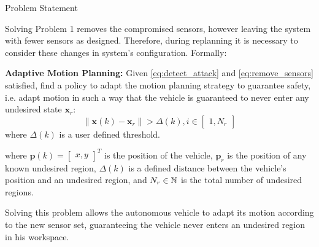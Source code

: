 \begin{section}{Problem Statement}
\begin{problem}
\end{problem}
Solving Problem 1 removes the compromised sensors, however leaving the system with fewer sensors as designed. Therefore, during replanning it is necessary to consider these changes in system's configuration. Formally:
	
\begin{problem} \label{problem2} {\textbf{Adaptive Motion Planning:}}
Given \eqref{eq:detect_attack} and \eqref{eq:remove_sensors} satisfied, find a policy to adapt the motion planning strategy  to guarantee safety, i.e. adapt motion in such a way that the vehicle is guaranteed to never enter any undesired state $\bm{x}_r$:
	\begin{equation}
		\lVert {\bm{x}(k)-\bm{x}_r} \rVert >\Delta(k),  i \in \begin{bmatrix} 1,N_r \end{bmatrix}
	\end{equation}
	where $\Delta(k)$ is a user defined threshold.
	\end{problem}
where $\bm{p}(k)={\begin{bmatrix} x,y \end{bmatrix}}^T$ is the position of the vehicle, $\bm{p}_r$ is the position of any known undesired region, $\Delta(k)$ is a defined distance between the vehicle's position and an undesired region, and $N_r \in \mathbb{N}$ is the total number of undesired regions. 



Solving this problem allows the autonomous vehicle to adapt its motion according to the new sensor set, guaranteeing the vehicle never enters an undesired region in his workspace.

\end{section}